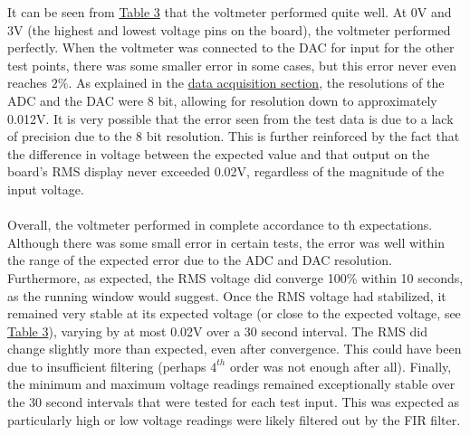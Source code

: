 \documentclass[12pt]{report}
\begin{document}
It can be seen from \hyperref[testdata]{Table 3} that the voltmeter performed quite well. At 0V and 3V (the
highest and lowest voltage pins on the board), the voltmeter performed perfectly. When the voltmeter
was connected to the DAC for input for the other test points, there was some smaller error in some
cases, but this error never even reaches $2\%$. As explained in the \hyperref[dataaq]{data
acquisition section}, the resolutions of the ADC and the DAC were 8 bit, allowing for resolution
down to approximately 0.012V. It is very possible that the error seen from the test data is due to a
lack of precision due to the 8 bit resolution. This is further reinforced by the fact that the
difference in voltage between the expected value and that output on the board's RMS display never
exceeded 0.02V, regardless of the magnitude of the input voltage.\\\\
Overall, the voltmeter performed in complete accordance to th expectations. Although there was some
small error in certain tests, the error was well within the range of the expected error due to the
ADC and DAC resolution. Furthermore, as expected, the RMS voltage did converge 100\% within 10
seconds, as the running window would suggest. Once the RMS voltage had stabilized, it remained very
stable at its expected voltage (or close to the expected voltage, see \hyperref[testdata]{Table 3}),
varying by at most 0.02V over a 30 second interval. The RMS did change slightly more than expected,
even after convergence. This could have been due to insufficient filtering (perhaps $4^{th}$ order
was not enough after all). Finally, the minimum and maximum voltage readings remained exceptionally
stable over the 30 second intervals that were tested for each test input. This was expected as
particularly high or low voltage readings were likely filtered out by the FIR filter.

\newpage
\end{document}
